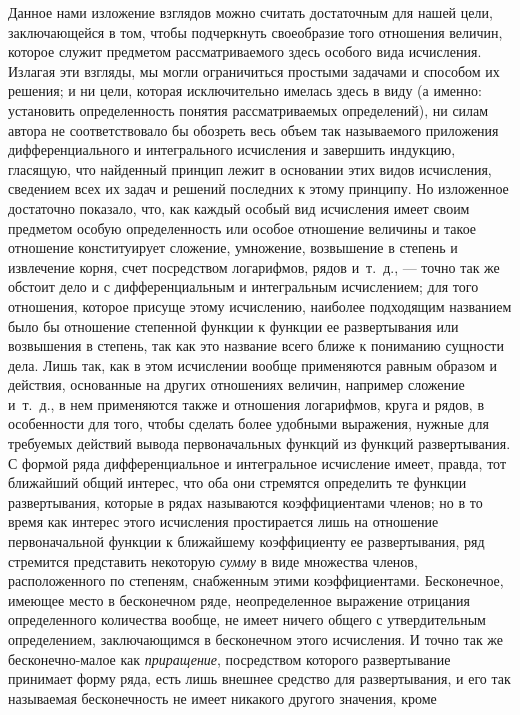 Данное нами изложение взглядов можно считать достаточным для нашей цели,
заключающейся в том, чтобы подчеркнуть своеобразие того отношения величин,
которое служит предметом рассматриваемого здесь особого вида исчисления.
Излагая эти взгляды, мы могли ограничиться простыми задачами и способом их
решения; и ни цели, которая исключительно имелась здесь в виду (а именно:
установить определенность понятия рассматриваемых определений), ни силам
автора не соответствовало бы обозреть весь объем так называемого приложения
дифференциального и интегрального исчисления и завершить индукцию, гласящую,
что найденный принцип лежит в основании этих видов исчисления, сведением
всех их задач и решений последних к этому принципу. Но изложенное
достаточно показало, что, как каждый особый вид исчисления имеет своим
предметом особую определенность или особое отношение величины и такое
отношение конституирует сложение, умножение, возвышение в степень и
извлечение корня, счет посредством логарифмов, рядов и~т.~д., — точно так
же обстоит дело и с дифференциальным и интегральным исчислением; для того
отношения, которое присуще этому исчислению, наиболее подходящим названием
было бы отношение степенной функции к функции ее развертывания или
возвышения в степень, так как это название всего ближе к пониманию сущности
дела. Лишь так, как в этом исчислении вообще применяются равным образом и
действия, основанные на других отношениях величин, например сложение
и~т.~д., в нем применяются также и отношения логарифмов, круга и рядов, в
особенности для того, чтобы сделать более удобными выражения, нужные для
требуемых действий вывода первоначальных функций из функций развертывания.
С формой ряда дифференциальное и интегральное исчисление имеет, правда, тот
ближайший общий интерес, что оба они стремятся определить те функции
развертывания, которые в рядах называются коэффициентами членов; но в то
время как интерес этого исчисления простирается лишь на отношение
первоначальной функции к ближайшему коэффициенту ее развертывания, ряд
стремится представить некоторую {\em сумму} в виде
множества членов, расположенного по степеням, снабженным этими
коэффициентами. Бесконечное, имеющее место в бесконечном ряде,
неопределенное выражение отрицания определенного количества вообще, не
имеет ничего общего с утвердительным определением, заключающимся в
бесконечном этого исчисления. И точно так же бесконечно-малое как
{\em приращение}, посредством которого развертывание
принимает форму ряда, есть лишь внешнее средство для развертывания, и его
так называемая бесконечность не имеет никакого другого значения, кроме
